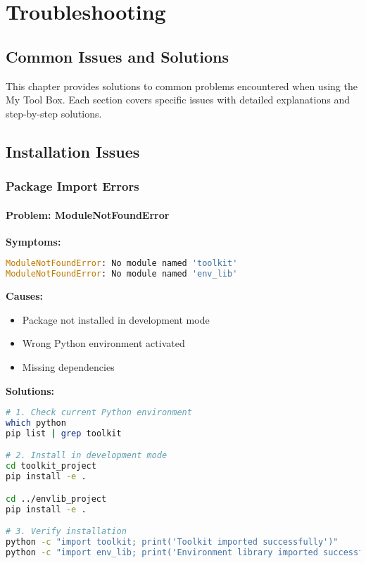 \chapter{Troubleshooting}

\section{Common Issues and Solutions}

This chapter provides solutions to common problems encountered when using the My Tool Box. Each section covers specific issues with detailed explanations and step-by-step solutions.

\section{Installation Issues}

\subsection{Package Import Errors}

\subsubsection{Problem: ModuleNotFoundError}

\textbf{Symptoms:}
\begin{lstlisting}[language=python]
ModuleNotFoundError: No module named 'toolkit'
ModuleNotFoundError: No module named 'env_lib'
\end{lstlisting}

\textbf{Causes:}
\begin{itemize}
    \item Package not installed in development mode
    \item Wrong Python environment activated
    \item Missing dependencies
\end{itemize}

\textbf{Solutions:}

\begin{lstlisting}[language=bash, caption=Fix Import Errors]
# 1. Check current Python environment
which python
pip list | grep toolkit

# 2. Install in development mode
cd toolkit_project
pip install -e .

cd ../envlib_project
pip install -e .

# 3. Verify installation
python -c "import toolkit; print('Toolkit imported successfully')"
python -c "import env_lib; print('Environment library imported successfully')"
\end{lstlisting}

